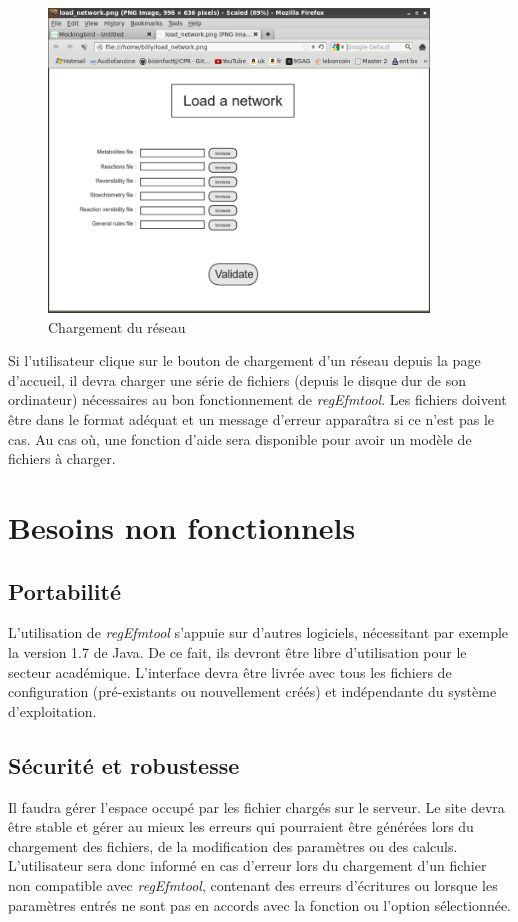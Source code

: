 \begin{figure}[!ht]
	\begin{center}
  		\includegraphics[width=0.90\textwidth]{load_firefox.png}  
  		\caption{Chargement du réseau}
  		\label{chargement}
	\end{center}
\end{figure}

Si l'utilisateur clique sur le bouton de chargement d'un réseau depuis la page d'accueil, il devra charger une série de fichiers (depuis le disque dur de son ordinateur) nécessaires au bon fonctionnement de \textit{regEfmtool}. Les fichiers doivent être dans le format adéquat et un message d'erreur appara\^itra si ce n'est pas le cas. Au cas où, une fonction d'aide sera disponible pour avoir un modèle de fichiers à charger. 

\section{Besoins non fonctionnels}

\subsection{Portabilité}
L'utilisation de \textit{regEfmtool} s'appuie sur d'autres logiciels, nécessitant par exemple la version 1.7 de Java. De ce fait, ils devront être libre d'utilisation pour le secteur académique. L'interface devra être livrée avec tous les fichiers de configuration (pré-existants ou nouvellement créés) et indépendante du système d'exploitation. 

\subsection{Sécurité et robustesse}
Il faudra gérer l'espace occupé par les fichier chargés sur le serveur. Le site devra être stable et gérer au mieux les erreurs qui pourraient être générées lors du chargement des fichiers, de la modification des paramètres ou des calculs. L'utilisateur sera donc informé en cas d'erreur lors du chargement d'un fichier non compatible avec \textit{regEfmtool}, contenant des erreurs d'écritures ou lorsque les paramètres entrés ne sont pas en accords avec la fonction ou l'option sélectionnée. 

